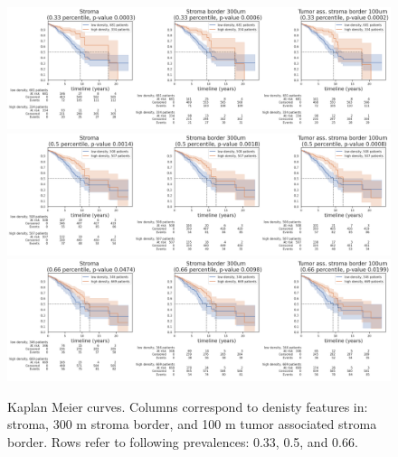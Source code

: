 \begin{figure}[h!]
\includegraphics[width=1.02\linewidth]{figures/survival/km_33.png}
\includegraphics[width=1.02\linewidth]{figures/survival/km_50.png}
\includegraphics[width=1.02\linewidth]{figures/survival/km_66.png}
\caption{Kaplan Meier curves.
Columns correspond to denisty features in: stroma, 300 \textmu m stroma border, and
100 \textmu m tumor associated stroma border. Rows refer to following prevalences: 0.33, 0.5, and 0.66.}
\label{fig:km}
\end{figure}

